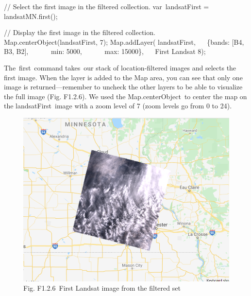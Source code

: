\documentclass[
  letterpaper,
  DIV=11,
  numbers=noendperiod]{scrreprt}
\newenvironment{Shaded}{\begin{snugshade}}{\end{snugshade}}
\newcommand{\BuiltInTok}[1]{\textcolor[rgb]{0.00,0.23,0.31}{#1}}
\newcommand{\CommentTok}[1]{\textcolor[rgb]{0.37,0.37,0.37}{#1}}
\newcommand{\DataTypeTok}[1]{\textcolor[rgb]{0.68,0.00,0.00}{#1}}
\newcommand{\DecValTok}[1]{\textcolor[rgb]{0.68,0.00,0.00}{#1}}
\newcommand{\FunctionTok}[1]{\textcolor[rgb]{0.28,0.35,0.67}{#1}}
\newcommand{\NormalTok}[1]{\textcolor[rgb]{0.00,0.23,0.31}{#1}}
\newcommand{\OperatorTok}[1]{\textcolor[rgb]{0.37,0.37,0.37}{#1}}
\newcommand{\StringTok}[1]{\textcolor[rgb]{0.13,0.47,0.30}{#1}}
\begin{document}
\begin{Shaded}
\begin{Highlighting}[]
\CommentTok{// Select the first image in the filtered collection.  }
\NormalTok{var landsatFirst }\OperatorTok{=}\NormalTok{ landsatMN}\OperatorTok{.}\FunctionTok{first}\NormalTok{()}\OperatorTok{;}  
  
\CommentTok{// Display the first image in the filtered collection.  }
\BuiltInTok{Map}\OperatorTok{.}\FunctionTok{centerObject}\NormalTok{(landsatFirst}\OperatorTok{,} \DecValTok{7}\NormalTok{)}\OperatorTok{;}  
\BuiltInTok{Map}\OperatorTok{.}\FunctionTok{addLayer}\NormalTok{(}
\NormalTok{    landsatFirst}\OperatorTok{,}  
\NormalTok{   \{}\DataTypeTok{bands}\OperatorTok{:}\NormalTok{ [}\StringTok{\textquotesingle{}B4\textquotesingle{}}\OperatorTok{,} \StringTok{\textquotesingle{}B3\textquotesingle{}}\OperatorTok{,} \StringTok{\textquotesingle{}B2\textquotesingle{}}\NormalTok{]}\OperatorTok{,}  
      \DataTypeTok{ min}\OperatorTok{:} \DecValTok{5000}\OperatorTok{,}  
      \DataTypeTok{ max}\OperatorTok{:} \DecValTok{15000}\NormalTok{\}}\OperatorTok{,}   
    \StringTok{\textquotesingle{}First Landsat 8\textquotesingle{}}\NormalTok{)}\OperatorTok{;}
\end{Highlighting}
\end{Shaded}

The~first~command takes~our stack of location-filtered images and
selects the first image. When the layer is added to the Map area, you
can see that only one image is returned---remember to uncheck the other
layers to be able to visualize the full image (Fig. F1.2.6). We used the
Map.centerObject~to center the map on the landsatFirst~image with a zoom
level of 7 (zoom levels go from 0 to 24).

\begin{figure}

{\centering \includegraphics{./F1/image43.png}

}

\caption{Fig. F1.2.6~First Landsat image from the filtered set}

\end{figure}
\end{document}
